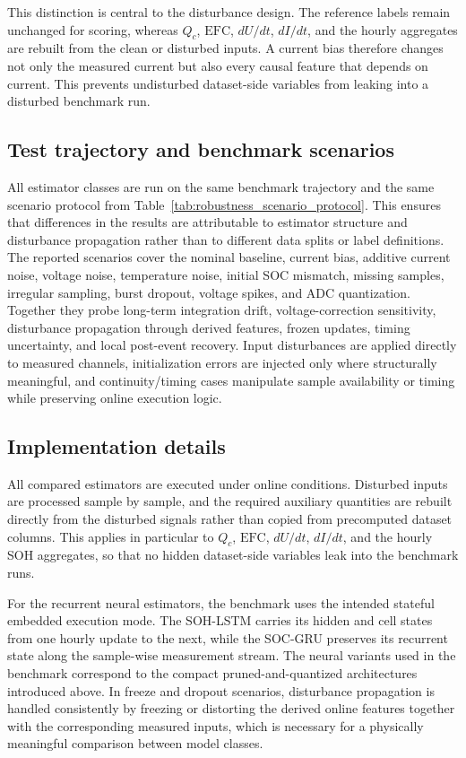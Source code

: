 \documentclass[
    a4paper,
    12pt,
    titlepage,
    bibliography=totoc,
    twoside=on,
    parskip=false,
    numbers=noenddot,
    cleardoublepage=empty,
    DIV=12,
    BCOR=12.0mm,
    headheight=36pt,
    headings=openright
]{scrreprt}
\begin{document}
This distinction is central to the disturbance design. The reference labels remain unchanged for scoring, whereas $Q_c$, $\mathrm{EFC}$, $dU/dt$, $dI/dt$, and the hourly aggregates are rebuilt from the clean or disturbed inputs. A current bias therefore changes not only the measured current but also every causal feature that depends on current. This prevents undisturbed dataset-side variables from leaking into a disturbed benchmark run.

\subsection{Test trajectory and benchmark scenarios}
All estimator classes are run on the same benchmark trajectory and the same scenario protocol from Table~\ref{tab:robustness_scenario_protocol}. This ensures that differences in the results are attributable to estimator structure and disturbance propagation rather than to different data splits or label definitions. The reported scenarios cover the nominal baseline, current bias, additive current noise, voltage noise, temperature noise, initial SOC mismatch, missing samples, irregular sampling, burst dropout, voltage spikes, and ADC quantization. Together they probe long-term integration drift, voltage-correction sensitivity, disturbance propagation through derived features, frozen updates, timing uncertainty, and local post-event recovery. Input disturbances are applied directly to measured channels, initialization errors are injected only where structurally meaningful, and continuity/timing cases manipulate sample availability or timing while preserving online execution logic.

\subsection{Implementation details}
All compared estimators are executed under online conditions. Disturbed inputs are processed sample by sample, and the required auxiliary quantities are rebuilt directly from the disturbed signals rather than copied from precomputed dataset columns. This applies in particular to $Q_c$, $\mathrm{EFC}$, $dU/dt$, $dI/dt$, and the hourly SOH aggregates, so that no hidden dataset-side variables leak into the benchmark runs.

For the recurrent neural estimators, the benchmark uses the intended stateful embedded execution mode. The SOH-LSTM carries its hidden and cell states from one hourly update to the next, while the SOC-GRU preserves its recurrent state along the sample-wise measurement stream. The neural variants used in the benchmark correspond to the compact pruned-and-quantized architectures introduced above. In freeze and dropout scenarios, disturbance propagation is handled consistently by freezing or distorting the derived online features together with the corresponding measured inputs, which is necessary for a physically meaningful comparison between model classes.
\end{document}
